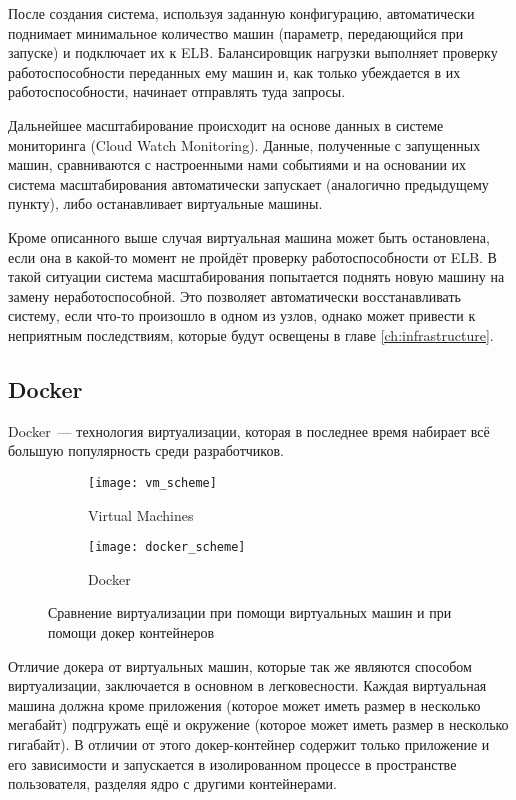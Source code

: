 	После создания система, используя заданную конфигурацию, автоматически поднимает минимальное количество машин (параметр, передающийся при запуске) и подключает их к ELB. Балансировщик нагрузки выполняет проверку работоспособности переданных ему машин и, как только убеждается в их работоспособности, начинает отправлять туда запросы.
	
	Дальнейшее масштабирование происходит на основе данных в системе мониторинга (Cloud Watch Monitoring). Данные, полученные с запущенных машин, сравниваются с настроенными нами событиями и на основании их система масштабирования автоматически  запускает (аналогично предыдущему пункту), либо останавливает виртуальные машины.
	
	Кроме описанного выше случая виртуальная машина может быть остановлена, если она в какой-то момент не пройдёт проверку работоспособности от ELB. В такой ситуации система масштабирования попытается поднять новую машину на замену неработоспособной. Это позволяет автоматически восстанавливать систему, если что-то произошло в одном из узлов, однако может привести к неприятным последствиям, которые будут освещены в главе \ref{ch:infrastructure}.

\subsection{Docker}\label{subsec:docker}

	Docker\cite{docker}~--- технология виртуализации, которая в последнее время набирает всё большую популярность среди разработчиков. 

\begin{figure}[ht]
	\centering
	\begin{subfigure}[b]{.5\textwidth}
  		\texttt{[image: vm\_scheme]}
  		\caption{Virtual Machines}
  		\label{fig:sub1}
	\end{subfigure}%
	\begin{subfigure}[b]{.5\textwidth}
  		\texttt{[image: docker\_scheme]}
  		\caption{Docker}
  		\label{fig:sub2}
	\end{subfigure}
	\caption{Сравнение виртуализации при помощи виртуальных машин и при помощи докер контейнеров}
	\label{fig:test}
\end{figure}	
	
	Отличие докера от виртуальных машин, которые так же являются способом виртуализации, заключается в основном в легковесности. Каждая виртуальная машина должна кроме приложения (которое может иметь размер в несколько мегабайт) подгружать ещё и окружение (которое может иметь размер в несколько гигабайт). В отличии от этого докер-контейнер содержит только приложение и его зависимости и запускается в изолированном процессе в пространстве пользователя, разделяя ядро с другими контейнерами.


